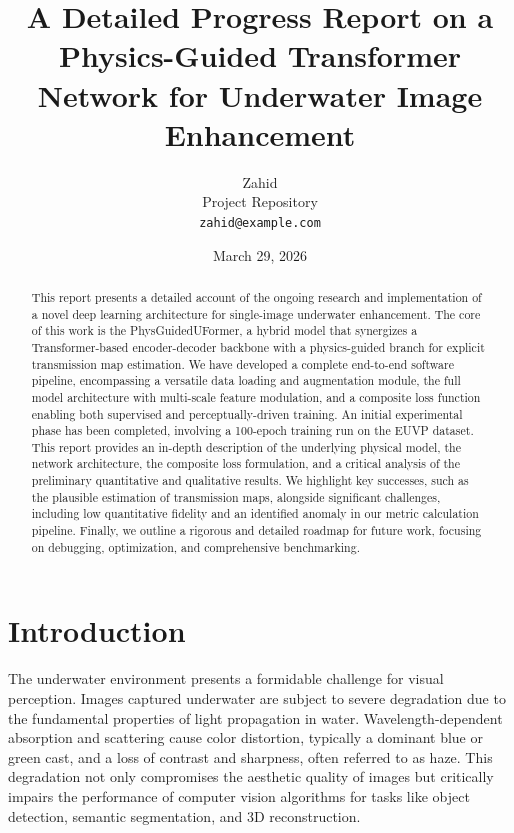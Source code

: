 \documentclass[10pt,twocolumn,letterpaper]{article}
\title{\textbf{A Detailed Progress Report on a Physics-Guided Transformer Network for Underwater Image Enhancement}}
\author{Zahid\\
Project Repository\\
{\tt\small zahid@example.com}
}
\date{\small March 29, 2026}
\begin{document}
\maketitle
\thispagestyle{empty}

\begin{abstract}
   This report presents a detailed account of the ongoing research and implementation of a novel deep learning architecture for single-image underwater enhancement. The core of this work is the PhysGuidedUFormer, a hybrid model that synergizes a Transformer-based encoder-decoder backbone with a physics-guided branch for explicit transmission map estimation. We have developed a complete end-to-end software pipeline, encompassing a versatile data loading and augmentation module, the full model architecture with multi-scale feature modulation, and a composite loss function enabling both supervised and perceptually-driven training. An initial experimental phase has been completed, involving a 100-epoch training run on the EUVP dataset. This report provides an in-depth description of the underlying physical model, the network architecture, the composite loss formulation, and a critical analysis of the preliminary quantitative and qualitative results. We highlight key successes, such as the plausible estimation of transmission maps, alongside significant challenges, including low quantitative fidelity and an identified anomaly in our metric calculation pipeline. Finally, we outline a rigorous and detailed roadmap for future work, focusing on debugging, optimization, and comprehensive benchmarking.
\end{abstract}

\section{Introduction}

The underwater environment presents a formidable challenge for visual perception. Images captured underwater are subject to severe degradation due to the fundamental properties of light propagation in water. Wavelength-dependent absorption and scattering cause color distortion, typically a dominant blue or green cast, and a loss of contrast and sharpness, often referred to as haze. This degradation not only compromises the aesthetic quality of images but critically impairs the performance of computer vision algorithms for tasks like object detection, semantic segmentation, and 3D reconstruction.
\end{document}
